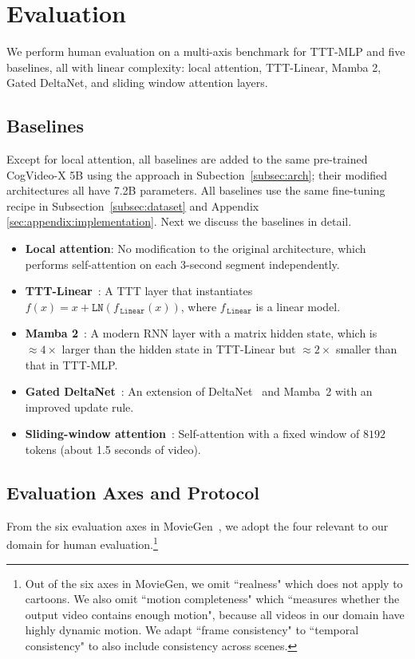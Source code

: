 \section{Evaluation}
\label{sec:experiment}

We perform human evaluation on a multi-axis benchmark for TTT-MLP and five baselines, all with linear complexity: local attention, TTT-Linear, Mamba 2, Gated DeltaNet, and sliding window attention layers.

\subsection{Baselines}
Except for local attention, all baselines are added to the same pre-trained CogVideo-X 5B using the approach in Subection~\ref{subsec:arch}; 
their modified architectures all have 7.2B parameters.
All baselines use the same fine-tuning recipe in Subsection~\ref{subsec:dataset}
and Appendix \ref{sec:appendix:implementation}.
Next we discuss the baselines in detail.
\vspace{0.2em}
\begin{itemize}[itemsep=0.2em]
\item\textbf{Local attention}: No modification to the original architecture, which performs self-attention on each 3-second segment independently.
\item\textbf{TTT-Linear}~\cite{sun2024ttt}: A TTT layer that instantiates $f(x) = x + \texttt{LN}(f_{\,\texttt{Linear}}(x))$, where $f_{\,\texttt{Linear}}$ is a linear model. 
\item\textbf{Mamba 2}~\cite{dao2024mamba2}: A modern RNN layer with a matrix hidden state, which is \(\approx4\times\) larger than the hidden state in TTT-Linear but \(\approx2\times\) smaller than that in TTT-MLP.
\item\textbf{Gated DeltaNet}~\cite{yang2025gateddeltanetworksimproving}: An extension of DeltaNet~\cite{yang2024parallelizing} and Mamba~2 with an improved update rule.
\item\textbf{Sliding-window attention}~\cite{beltagy2020longformerlongdocumenttransformer}: Self-attention with a fixed window of $8192$ tokens (about 1.5 seconds of video). 
\end{itemize}

\subsection{Evaluation Axes and Protocol}
\label{subsec:quan_eval}
From the six evaluation axes in MovieGen~\cite{meta2024moviegen}, we adopt the four relevant to our domain for human evaluation.\footnote{
Out of the six axes in MovieGen, we omit ``realness" which does not apply to cartoons.
We also omit ``motion completeness" which ``measures whether the output video contains enough motion", because all videos in our domain have highly dynamic motion.
We adapt ``frame consistency" to ``temporal consistency" to also include consistency across scenes.}

